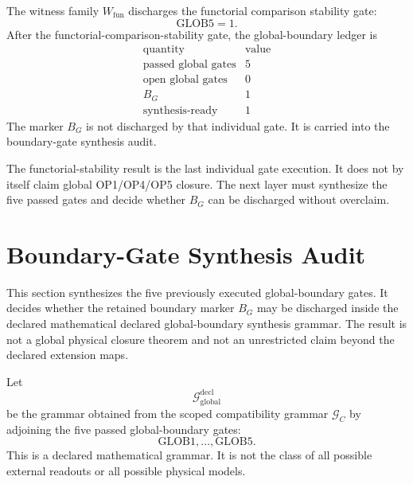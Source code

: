 \begin{theorem}
The witness family \(W_{\mathrm{fun}}\) discharges the functorial comparison
stability gate:
\[
    \mathrm{GLOB5}=1.
\]
After the functorial-comparison-stability gate, the global-boundary ledger is
\[
\begin{array}{c|r}
\text{quantity} & \text{value}\\
\hline
\text{passed global gates} & 5\\
\text{open global gates} & 0\\
B_G & 1\\
\text{synthesis-ready} & 1
\end{array}
\]
The marker \(B_G\) is not discharged by that individual gate.  It is carried into the
boundary-gate synthesis audit.
\end{theorem}

\begin{remark}
The functorial-stability result is the last individual gate execution.  It does not by itself
claim global OP1/OP4/OP5 closure.  The next layer must synthesize the five
passed gates and decide whether \(B_G\) can be discharged without overclaim.
\end{remark}



\section{Boundary-Gate Synthesis Audit}
\label{sec:v450-r21-boundary-gate-synthesis-audit}

This section synthesizes the five previously executed global-boundary gates.
It decides whether the retained boundary marker \(B_G\) may be discharged
inside the declared mathematical declared global-boundary synthesis grammar.  The result is not a
global physical closure theorem and not an unrestricted claim beyond the
declared extension maps.

\begin{definition}
Let
\[
    \mathcal G_{\mathrm{global}}^{\mathrm{decl}}
\]
be the grammar obtained from the scoped compatibility grammar \(\mathcal G_C\)
by adjoining the five passed global-boundary gates:
\[
    \mathrm{GLOB1},\ldots,\mathrm{GLOB5}.
\]
This is a declared mathematical grammar.  It is not the class of all possible
external readouts or all possible physical models.
\end{definition}

